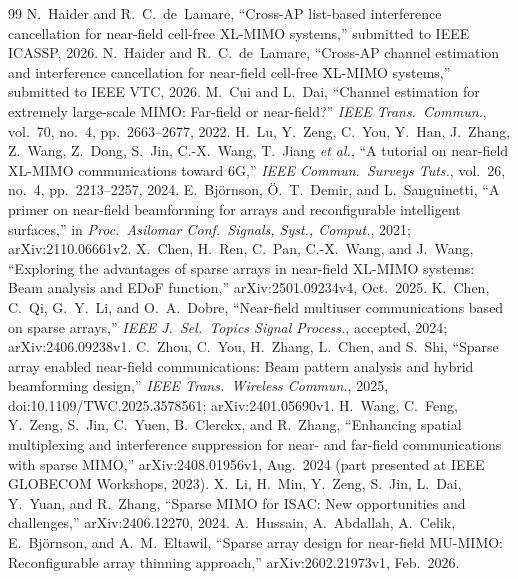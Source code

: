 \documentclass[11pt]{article}
\begin{document}
\begin{thebibliography}{99}\small
{} N.~Haider and R.~C.~de~Lamare, ``Cross-AP list-based interference cancellation for near-field cell-free XL-MIMO systems,'' submitted to IEEE ICASSP, 2026.
 N.~Haider and R.~C.~de~Lamare, ``Cross-AP channel estimation and interference cancellation for near-field cell-free XL-MIMO systems,'' submitted to IEEE VTC, 2026.
 M.~Cui and L.~Dai, ``Channel estimation for extremely large-scale MIMO: Far-field or near-field?'' \emph{IEEE Trans.\ Commun.}, vol.~70, no.~4, pp.~2663--2677, 2022.
 H.~Lu, Y.~Zeng, C.~You, Y.~Han, J.~Zhang, Z.~Wang, Z.~Dong, S.~Jin, C.-X.~Wang, T.~Jiang \emph{et al.}, ``A tutorial on near-field XL-MIMO communications toward 6G,'' \emph{IEEE Commun.\ Surveys Tuts.}, vol.~26, no.~4, pp.~2213--2257, 2024.
 E.~Bj\"ornson, \"O.~T.~Demir, and L.~Sanguinetti, ``A primer on near-field beamforming for arrays and reconfigurable intelligent surfaces,'' in \emph{Proc.\ Asilomar Conf.\ Signals, Syst., Comput.}, 2021; arXiv:2110.06661v2.
 X.~Chen, H.~Ren, C.~Pan, C.-X.~Wang, and J.~Wang, ``Exploring the advantages of sparse arrays in near-field XL-MIMO systems: Beam analysis and EDoF function,'' arXiv:2501.09234v4, Oct.\ 2025.
 K.~Chen, C.~Qi, G.~Y.~Li, and O.~A.~Dobre, ``Near-field multiuser communications based on sparse arrays,'' \emph{IEEE J.\ Sel.\ Topics Signal Process.}, accepted, 2024; arXiv:2406.09238v1.
 C.~Zhou, C.~You, H.~Zhang, L.~Chen, and S.~Shi, ``Sparse array enabled near-field communications: Beam pattern analysis and hybrid beamforming design,'' \emph{IEEE Trans.\ Wireless Commun.}, 2025, doi:10.1109/TWC.2025.3578561; arXiv:2401.05690v1.
 H.~Wang, C.~Feng, Y.~Zeng, S.~Jin, C.~Yuen, B.~Clerckx, and R.~Zhang, ``Enhancing spatial multiplexing and interference suppression for near- and far-field communications with sparse MIMO,'' arXiv:2408.01956v1, Aug.\ 2024 (part presented at IEEE GLOBECOM Workshops, 2023).
 X.~Li, H.~Min, Y.~Zeng, S.~Jin, L.~Dai, Y.~Yuan, and R.~Zhang, ``Sparse MIMO for ISAC: New opportunities and challenges,'' arXiv:2406.12270, 2024.
 A.~Hussain, A.~Abdallah, A.~Celik, E.~Bj\"ornson, and A.~M.~Eltawil, ``Sparse array design for near-field MU-MIMO: Reconfigurable array thinning approach,'' arXiv:2602.21973v1, Feb.\ 2026.

\end{thebibliography}
\end{document}
